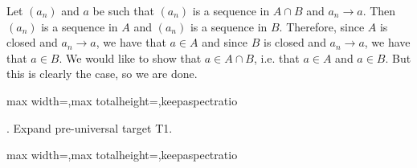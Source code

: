 \documentclass[a4paper,twoside,12pt]{article} %
\makeatletter
\DeclareRobustCommand{\_}{%
  \leavevmode\vbox{%
    \hrule\@width.4em
          \@height-.16ex
          \@depth\dimexpr.16ex+.28pt\relax}}
\newcommand\Tstrut{\rule{0pt}{2.4ex}}
\newcommand\Bstrut{\rule[-1.1ex]{0pt}{0pt}}
\newenvironment{fit}{\begin{adjustbox}{max width=\textwidth,max totalheight=\textheight,keepaspectratio}}{\end{adjustbox}}
\makeatother
\begin{document}
\begin{center}
\begin{minipage}{120mm}
Let $(a_n)$ and $a$ be such that $(a_n)$ is a sequence in $A\cap B$ and $a_n\to a$. Then $(a_n)$ is a sequence in $A$ and $(a_n)$ is a sequence in $B$. Therefore, since $A$ is closed and $a_n\to a$, we have that $a\in A$ and since $B$ is closed and $a_n\to a$, we have that $a\in B$. We would like to show that $a\in A\cap B$, i.e. that $a\in A$ and $a\in B$. But this is clearly the case, so we are done.
\end{minipage}
\end{center}

\bigskip
\begin{steps}
\begin{fit}%
\end{fit}
\smallskip

. Expand pre-universal target T1.\nopagebreak[4] 
\marginpar{}\nopagebreak[4] 
\smallskip\nopagebreak[4] 

\begin{fit}%
\end{fit}
\smallskip


\end{steps}
\end{document}
